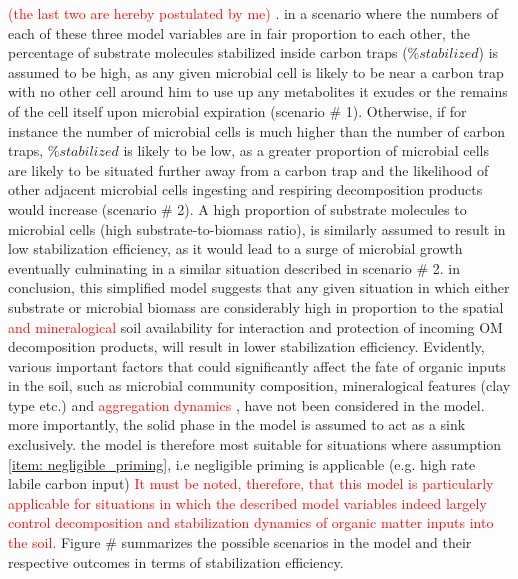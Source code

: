 \documentclass[12pt]{report}
\newcommand{\myRed}[1]{\textcolor{red}{#1}} %
\begin{document}
			 \myRed{(the last two are hereby postulated by me)} . in a scenario where the numbers of each of these three model variables are in fair proportion to each other, the percentage of substrate molecules stabilized inside carbon traps ($ \%stabilized $) is assumed to be high, as any given microbial cell is likely to be near a carbon trap with no other cell around him to use up any metabolites it exudes or the remains of the cell itself upon microbial expiration (scenario \# 1). Otherwise, if for instance the number of microbial cells is much higher than the number of carbon traps, $ \%stabilized  $ is likely to be low, as a greater proportion of microbial cells are likely to be situated further away from a carbon trap and the likelihood of other adjacent microbial cells ingesting and respiring decomposition products would increase (scenario \# 2). A high proportion of substrate molecules to microbial cells (high substrate-to-biomass ratio),  is similarly assumed to result in low stabilization efficiency, as it would lead to a surge  of microbial growth eventually culminating in a similar situation described in scenario \# 2. in conclusion, this simplified model suggests that any given situation in which either substrate or microbial biomass are considerably high in proportion to the spatial \myRed{and mineralogical} soil availability for interaction and protection of incoming OM decomposition products, will result in lower stabilization efficiency. Evidently, various important factors that could significantly affect the fate of organic inputs in the soil, such as microbial community composition, mineralogical features (clay type etc.) and \myRed{aggregation dynamics} , have not been considered in the model. more importantly, the solid phase in the model is assumed to act as a sink exclusively. the model is therefore most suitable for situations where assumption \ref{item: negligible_priming}, i.e negligible priming is applicable (e.g. high rate labile carbon input) \myRed{It must be noted, therefore, that this model is particularly applicable for situations in which the described model variables indeed largely control decomposition and stabilization dynamics of organic matter inputs into the soil.} Figure \# summarizes the possible scenarios in the model and their respective outcomes in terms of stabilization efficiency.\\
\end{document}
